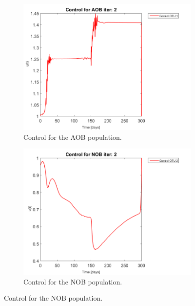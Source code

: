 \documentclass[3p,times]{article}
\begin{document}
\begin{figure}[h]
	\centering
	\begin{subfigure}{0.45 \linewidth}
		\includegraphics[width=\linewidth]{proof_of_concept/250309_POC_try3_iter_2_Control_AOB_plot_1}
	\caption{Control for the AOB population.}
	\label{Control AOB no noise}
	\end{subfigure}
	\begin{subfigure}{0.45 \linewidth}
		\centering
		\includegraphics[width=\linewidth]{proof_of_concept/250309_POC_try3_iter_2_Control_NOB_plot_1}
	\caption{Control for the NOB population.}
	\label{Control NOB no noise}
	\end{subfigure}


\end{figure}
\end{document}

